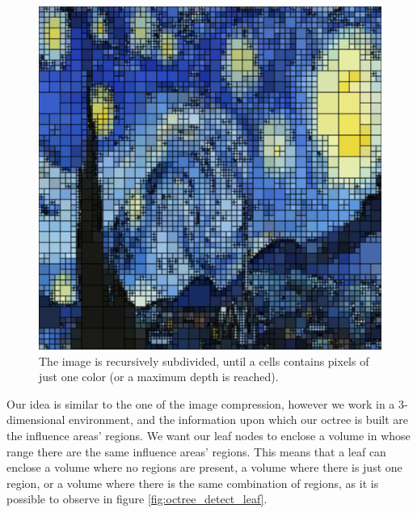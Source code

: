 \documentclass{PoliMi_MasterThesis}
\begin{document}
\begin{figure}[H]
	\centering
	\includegraphics[width=\textwidth*\real{0.7}]{Images/quadtree_for_compression.png}
	\caption{The image is recursively subdivided, until a cells contains pixels of just one color (or a maximum depth is reached).}
	\label{fig:quadtree_for_compression}
\end{figure}

Our idea is similar to the one of the image compression, however we work in a 3-dimensional environment, and the information upon which our octree is built are the influence areas' regions. We want our leaf nodes to enclose a volume in whose range there are the same influence areas' regions. This means that a leaf can enclose a volume where no regions are present, a volume where there is just one region, or a volume where there is the same combination of regions, as it is possible to observe in figure \ref{fig:octree_detect_leaf}.
\end{document}
